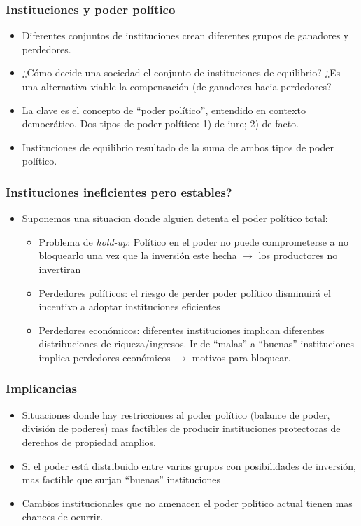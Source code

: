 \documentclass[handout,final,xcolor=dvipsnames]{beamer}
\begin{document}
\begin{frame}\frametitle{Instituciones y poder político}
\begin{itemize}\itemsep 15pt
\item Diferentes conjuntos de instituciones crean diferentes grupos de
  ganadores y perdedores. 
\item ¿Cómo decide una sociedad el conjunto de instituciones de
  equilibrio? ¿Es una alternativa viable la compensación (de ganadores
  hacia perdedores?
\item La clave es el concepto de ``poder político'', entendido en
  contexto democrático. Dos tipos de poder político: 1) de iure; 2) de
  facto. 
\item Instituciones de equilibrio resultado de la suma de ambos tipos
  de poder político. 
\end{itemize}
\end{frame}

\begin{frame}\frametitle{Instituciones ineficientes pero estables?}
\begin{itemize}\itemsep 15pt
\item Suponemos una situacion donde alguien detenta el poder político
  total:
\begin{itemize}\itemsep 15pt \medskip 
\item Problema de \textit{hold-up}: Político en el poder no puede comprometerse a no bloquearlo una
  vez que la inversión este hecha $\longrightarrow$ los productores no
  invertiran
\item Perdedores políticos: el riesgo de perder poder político
  disminuirá el incentivo a adoptar instituciones eficientes
\item Perdedores económicos: diferentes instituciones implican
  diferentes distribuciones de riqueza/ingresos. Ir de ``malas'' a
  ``buenas'' instituciones implica perdedores económicos
  $\longrightarrow$ motivos para bloquear.  
\end{itemize}
\end{itemize}
\end{frame}


\begin{frame}\frametitle{Implicancias}
\begin{itemize}\itemsep 15pt
\item Situaciones donde hay restricciones al poder político (balance
  de poder, división de poderes) mas factibles de producir
  instituciones protectoras de derechos de propiedad amplios. 
\item Si el poder está distribuido entre varios grupos con
  posibilidades de inversión, mas factible que surjan ``buenas''
  instituciones
\item Cambios institucionales que no amenacen el poder político actual
  tienen mas chances de ocurrir. 
\end{itemize}
\end{frame}
\end{document}
